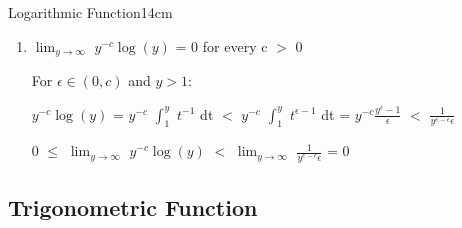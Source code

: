 \begin{definition}{Logarithmic Function}{14cm}
\begin{enumerate}[label=(\alph*), leftmargin=1.5cm, itemsep=0.1cm]
                Thus:

                \hspace{0.5cm}
                If c $\not =$ -1, then $\int$ $y^c$ dy
                = $\int$ $\frac{1}{c+1} (y^{c+1})'$ dy
                = $\frac{1}{c+1}y^{c+1}$

                \hspace{0.5cm}
                If c = -1, then $\int$ $y^{-1}$ dy
                = $\int$ L'(y) dy
                = L(y) = log(y)

            \item $\lim_{y \rightarrow \infty}$ $y^{-c} \log(y)$ = 0
                for every c $>$ 0
            
                For $\epsilon \in (0,c)$ and $y > 1$:

                \hspace{0.5cm}
                $y^{-c} \log(y)$
                = $y^{-c}$ $\int_1^y$ $t^{-1}$ dt
                $<$ $y^{-c}$ $\int_1^y$ $t^{\epsilon - 1}$ dt
                = $y^{-c} \frac{y^{\epsilon} - 1}{\epsilon}$
                $<$ $\frac{1}{y^{c - \epsilon}\epsilon}$

                \hspace{0.5cm}
                0 $\leq$ $\lim_{y \rightarrow \infty}$ $y^{-c} \log(y)$
                $<$ $\lim_{y \rightarrow \infty}$
                $\frac{1}{y^{c - \epsilon}\epsilon}$
                = 0
        \end{enumerate}
    \end{definition}

    \newpage





\subsection{ Trigonometric Function }

